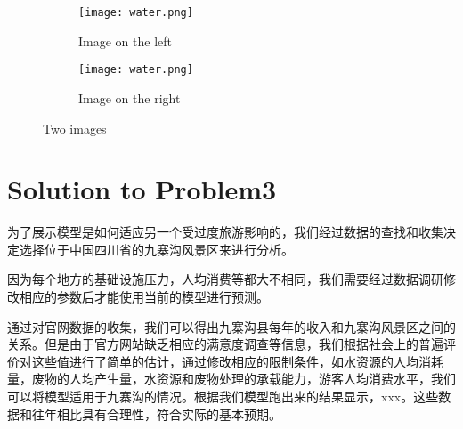 \documentclass[12pt]{article}  %
\begin{document}
\begin{figure}[htbp]
\centering
\begin{subfigure}[b]{.4\textwidth}
\texttt{[image: water.png]}
\caption{Image on the left}\label{subfig:left}
\end{subfigure}
\begin{subfigure}[b]{.4\textwidth}
\texttt{[image: water.png]}
\caption{Image on the right}\label{subfig:right}
\end{subfigure}
\caption{Two images}\label{fig:subfigures}
\end{figure}

\section{Solution to Problem3}
为了展示模型是如何适应另一个受过度旅游影响的，我们经过数据的查找和收集决定选择位于中国四川省的九寨沟风景区来进行分析。

因为每个地方的基础设施压力，人均消费等都大不相同，我们需要经过数据调研修改相应的参数后才能使用当前的模型进行预测。

通过对官网数据的收集\cite{8}，我们可以得出九寨沟县每年的收入和九寨沟风景区之间的关系。但是由于官方网站缺乏相应的满意度调查等信息，我们根据社会上的普遍评价对这些值进行了简单的估计，通过修改相应的限制条件，如水资源的人均消耗量，废物的人均产生量，水资源和废物处理的承载能力，游客人均消费水平，我们可以将模型适用于九寨沟的情况。根据我们模型跑出来的结果显示，xxx。这些数据和往年相比具有合理性，符合实际的基本预期。
\end{document}
